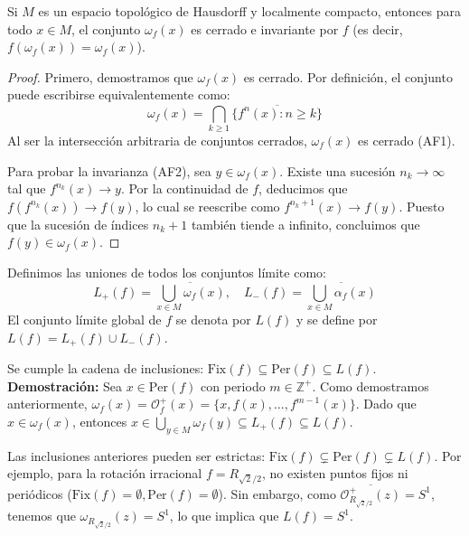 \begin{proposicion}
	Si $M$ es un espacio topológico de Hausdorff y localmente compacto, entonces para todo $x \in M$, el conjunto $\omega_f(x)$ es cerrado e invariante por $f$ (es decir, $f(\omega_f(x)) = \omega_f(x)$).
\end{proposicion}

\begin{proof}
	Primero, demostramos que $\omega_f(x)$ es cerrado. Por definición, el conjunto puede escribirse equivalentemente como:
	$$\omega_f(x) = \bigcap_{k \ge 1} \overline{\{f^n(x) : n \ge k\}}$$
	Al ser la intersección arbitraria de conjuntos cerrados, $\omega_f(x)$ es cerrado (AF1).
	
	Para probar la invarianza (AF2), sea $y \in \omega_f(x)$. Existe una sucesión $n_k \to \infty$ tal que $f^{n_k}(x) \to y$. Por la continuidad de $f$, deducimos que $f(f^{n_k}(x)) \to f(y)$, lo cual se reescribe como $f^{n_k+1}(x) \to f(y)$. Puesto que la sucesión de índices $n_k+1$ también tiende a infinito, concluimos que $f(y) \in \omega_f(x)$. 
\end{proof}

\begin{definicion}
	Definimos las uniones de todos los conjuntos límite como:
	$$L_+(f) = \overline{\bigcup_{x \in M} \omega_f(x)}, \quad L_-(f) = \overline{\bigcup_{x \in M} \alpha_f(x)}$$
	El conjunto límite global de $f$ se denota por $L(f)$ y se define por $L(f) = L_+(f) \cup L_-(f)$.
\end{definicion}

\begin{observacion}
	Se cumple la cadena de inclusiones: $\text{Fix}(f) \subseteq \text{Per}(f) \subseteq L(f)$.
	\textbf{Demostración:} Sea $x \in \text{Per}(f)$ con periodo $m \in \mathbb{Z}^+$. Como demostramos anteriormente, $\omega_f(x) = \mathcal{O}_f^+(x) = \{x, f(x), \dots, f^{m-1}(x)\}$. Dado que $x \in \omega_f(x)$, entonces $x \in \bigcup_{y \in M} \omega_f(y) \subseteq L_+(f) \subseteq L(f)$.
\end{observacion}

\begin{observacion}
	Las inclusiones anteriores pueden ser estrictas: $\text{Fix}(f) \subsetneq \text{Per}(f) \subsetneq L(f)$.
	Por ejemplo, para la rotación irracional $f = R_{\sqrt{2}/2}$, no existen puntos fijos ni periódicos ($\text{Fix}(f) = \emptyset, \text{Per}(f) = \emptyset$). Sin embargo, como $\overline{\mathcal{O}_{R_{\sqrt{2}/2}}^+(z)} = S^1$, tenemos que $\omega_{R_{\sqrt{2}/2}}(z) = S^1$, lo que implica que $L(f) = S^1$.
\end{observacion}

